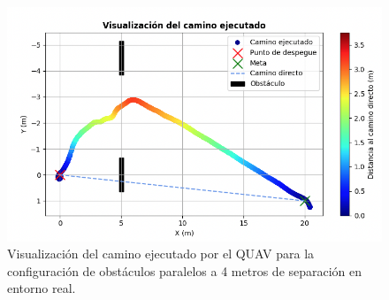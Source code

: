 \begin{figure}[H]
    \centering
    \includegraphics[scale=0.5]{partes/img/real-3-parallelB-2-graph.png}
    \caption[Visualización del camino ejecutado por el QUAV para la configuración de obstáculos paralelos a 4 metros de separación en entorno real.]{Visualización del camino ejecutado por el QUAV para la configuración de obstáculos paralelos a 4 metros de separación en entorno real.}
    \label{real-3-parallelB-2-graph}
\end{figure}

